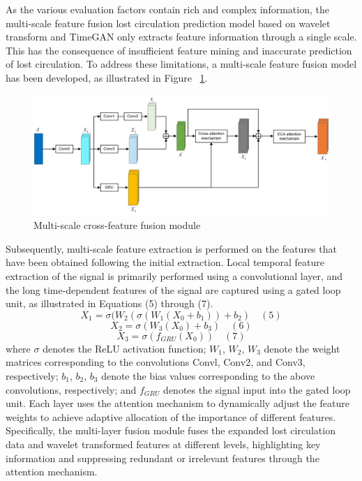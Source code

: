 \documentclass[journal,article,submit,pdftex,moreauthors]{Definitions/mdpi}
\begin{document}
As the various evaluation factors contain rich and complex information, the multi-scale feature fusion lost circulation prediction model based on wavelet transform and TimeGAN only extracts feature information through a single scale. This has the consequence of insufficient feature mining and inaccurate prediction of lost circulation. To address these limitations, a multi-scale feature fusion model has been developed, as illustrated in Figure  ~\ref{fig:Multi-scale cross-feature fusion module}.

\begin{figure}[h]
    \centering
    \includegraphics[width=0.75\linewidth]{图片/多尺度特征注意力.png}
    \caption{Multi-scale cross-feature fusion module}
    \label{fig:Multi-scale cross-feature fusion module}
\end{figure}
Subsequently, multi-scale feature extraction is performed on the features that have been obtained following the initial extraction. Local temporal feature extraction of the signal is primarily performed using a convolutional layer, and the long time-dependent features of the signal are captured using a gated loop unit, as illustrated in Equations (5) through (7).
\[{{X}_{1}}=\sigma ({{W}_{2}}(\sigma ({{W}_{1}}({{X}_{0}}+{{b}_{1}}))+{{b}_{2}})\quad (5)\]
	\[{{X}_{2}}=\sigma ({{W}_{3}}({{X}_{0}})+{{b}_{3}})\quad (6)\]
	\[{{X}_{3}}=\sigma ({{f}_{GRU}}({{X}_{0}}))\quad (7)\]
    where $\sigma$ denotes the ReLU activation function; \({{W}_{1}}\), \({{W}_{2}}\),  \({{W}_{3}}\) denote the weight matrices corresponding to the convolutions Convl, Conv2, and Conv3, respectively; \({{b}_{1}}\), \({{b}_{2}}\), \({{b}_{3}}\) denote the bias values corresponding to the above convolutions, respectively; and \({{f}_{GRU}}\) denotes the signal input into the gated loop unit.
    Each layer uses the attention mechanism to dynamically adjust the feature weights to achieve adaptive allocation of the importance of different features. Specifically, the multi-layer fusion module fuses the expanded lost circulation data and wavelet transformed features at different levels, highlighting key information and suppressing redundant or irrelevant features through the attention mechanism.
\end{document}
